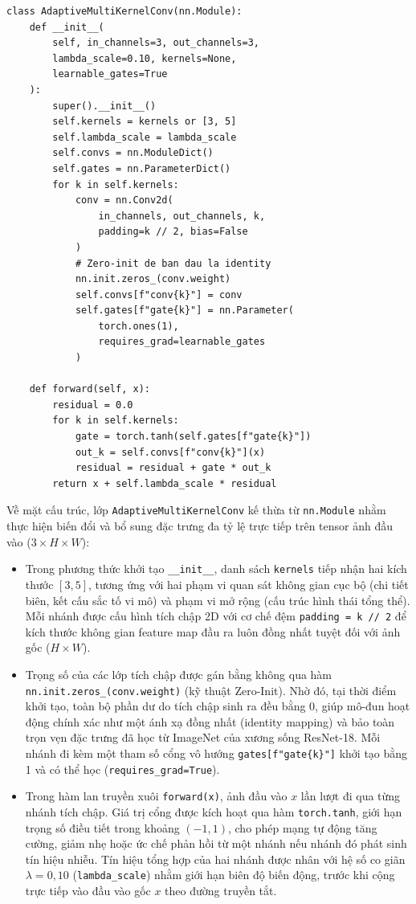 \begin{lstlisting}[caption={Cài đặt mô-đun tích chập đa kernel thích nghi (AMKC)}]
class AdaptiveMultiKernelConv(nn.Module):
    def __init__(
        self, in_channels=3, out_channels=3,
        lambda_scale=0.10, kernels=None,
        learnable_gates=True
    ):
        super().__init__()
        self.kernels = kernels or [3, 5]
        self.lambda_scale = lambda_scale
        self.convs = nn.ModuleDict()
        self.gates = nn.ParameterDict()
        for k in self.kernels:
            conv = nn.Conv2d(
                in_channels, out_channels, k,
                padding=k // 2, bias=False
            )
            # Zero-init de ban dau la identity
            nn.init.zeros_(conv.weight)
            self.convs[f"conv{k}"] = conv
            self.gates[f"gate{k}"] = nn.Parameter(
                torch.ones(1),
                requires_grad=learnable_gates
            )

    def forward(self, x):
        residual = 0.0
        for k in self.kernels:
            gate = torch.tanh(self.gates[f"gate{k}"])
            out_k = self.convs[f"conv{k}"](x)
            residual = residual + gate * out_k
        return x + self.lambda_scale * residual
\end{lstlisting}
Về mặt cấu trúc, lớp \texttt{AdaptiveMultiKernelConv} kế thừa từ \texttt{nn.Module} nhằm thực hiện biến đổi và bổ sung đặc trưng đa tỷ lệ trực tiếp trên tensor ảnh đầu vào ($3\times H\times W$):
\begin{itemize}
  \item Trong phương thức khởi tạo \texttt{\_\_init\_\_}, danh sách \texttt{kernels} tiếp nhận hai kích thước $[3, 5]$, tương ứng với hai phạm vi quan sát không gian cục bộ (chi tiết biên, kết cấu sắc tố vi mô) và phạm vi mở rộng (cấu trúc hình thái tổng thể). Mỗi nhánh được cấu hình tích chập 2D với cơ chế đệm \texttt{padding = k // 2} để kích thước không gian feature map đầu ra luôn đồng nhất tuyệt đối với ảnh gốc ($H \times W$).
  \item Trọng số của các lớp tích chập được gán bằng không qua hàm \texttt{nn.init.zeros\_(conv.weight)} (kỹ thuật Zero-Init). Nhờ đó, tại thời điểm khởi tạo, toàn bộ phần dư do tích chập sinh ra đều bằng 0, giúp mô-đun hoạt động chính xác như một ánh xạ đồng nhất (identity mapping) và bảo toàn trọn vẹn đặc trưng đã học từ ImageNet của xương sống ResNet-18. Mỗi nhánh đi kèm một tham số cổng vô hướng \texttt{gates[f"gate\{k\}"]} khởi tạo bằng 1 và có thể học (\texttt{requires\_grad=True}).
  \item Trong hàm lan truyền xuôi \texttt{forward(x)}, ảnh đầu vào $x$ lần lượt đi qua từng nhánh tích chập. Giá trị cổng được kích hoạt qua hàm \texttt{torch.tanh}, giới hạn trọng số điều tiết trong khoảng $(-1, 1)$, cho phép mạng tự động tăng cường, giảm nhẹ hoặc ức chế phản hồi từ một nhánh nếu nhánh đó phát sinh tín hiệu nhiễu. Tín hiệu tổng hợp của hai nhánh được nhân với hệ số co giãn $\lambda = 0{,}10$ (\texttt{lambda\_scale}) nhằm giới hạn biên độ biến động, trước khi cộng trực tiếp vào đầu vào gốc $x$ theo đường truyền tắt.
\end{itemize}


